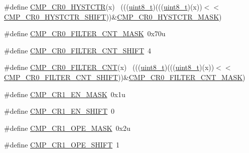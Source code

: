 \begin{DoxyCompactItemize}
\item 
\#define \hyperlink{group___c_m_p___register___masks_ga3ac2621a332671b38fa231e1fa14d26d}{C\+M\+P\+\_\+\+C\+R0\+\_\+\+H\+Y\+S\+T\+C\+TR}(x)                                          ~(((\hyperlink{_p_e___types_8h_aba7bc1797add20fe3efdf37ced1182c5}{uint8\+\_\+t})(((\hyperlink{_p_e___types_8h_aba7bc1797add20fe3efdf37ced1182c5}{uint8\+\_\+t})(x))$<$$<$\hyperlink{group___c_m_p___register___masks_ga12a965eae39b79d9e6066de9af418df3}{C\+M\+P\+\_\+\+C\+R0\+\_\+\+H\+Y\+S\+T\+C\+T\+R\+\_\+\+S\+H\+I\+FT}))\&\hyperlink{group___c_m_p___register___masks_ga9a81a95d8ceda15abb107f3c961e2f03}{C\+M\+P\+\_\+\+C\+R0\+\_\+\+H\+Y\+S\+T\+C\+T\+R\+\_\+\+M\+A\+SK})
\item 
\#define \hyperlink{group___c_m_p___register___masks_gab1e98c122818fe880217f72fab932ac2}{C\+M\+P\+\_\+\+C\+R0\+\_\+\+F\+I\+L\+T\+E\+R\+\_\+\+C\+N\+T\+\_\+\+M\+A\+SK}~0x70u
\item 
\#define \hyperlink{group___c_m_p___register___masks_ga07a4d57ab7d44b55b3d73f612aa7dd98}{C\+M\+P\+\_\+\+C\+R0\+\_\+\+F\+I\+L\+T\+E\+R\+\_\+\+C\+N\+T\+\_\+\+S\+H\+I\+FT}~4
\item 
\#define \hyperlink{group___c_m_p___register___masks_gad9cbe394311ddbb43945fcdade409c9e}{C\+M\+P\+\_\+\+C\+R0\+\_\+\+F\+I\+L\+T\+E\+R\+\_\+\+C\+NT}(x)                                    ~(((\hyperlink{_p_e___types_8h_aba7bc1797add20fe3efdf37ced1182c5}{uint8\+\_\+t})(((\hyperlink{_p_e___types_8h_aba7bc1797add20fe3efdf37ced1182c5}{uint8\+\_\+t})(x))$<$$<$\hyperlink{group___c_m_p___register___masks_ga07a4d57ab7d44b55b3d73f612aa7dd98}{C\+M\+P\+\_\+\+C\+R0\+\_\+\+F\+I\+L\+T\+E\+R\+\_\+\+C\+N\+T\+\_\+\+S\+H\+I\+FT}))\&\hyperlink{group___c_m_p___register___masks_gab1e98c122818fe880217f72fab932ac2}{C\+M\+P\+\_\+\+C\+R0\+\_\+\+F\+I\+L\+T\+E\+R\+\_\+\+C\+N\+T\+\_\+\+M\+A\+SK})
\item 
\#define \hyperlink{group___c_m_p___register___masks_ga2492ad39a9661a1217cc26f20bd31ef2}{C\+M\+P\+\_\+\+C\+R1\+\_\+\+E\+N\+\_\+\+M\+A\+SK}~0x1u
\item 
\#define \hyperlink{group___c_m_p___register___masks_gacaacf0894bdf41eb49de1ae81075fa2b}{C\+M\+P\+\_\+\+C\+R1\+\_\+\+E\+N\+\_\+\+S\+H\+I\+FT}~0
\item 
\#define \hyperlink{group___c_m_p___register___masks_gaaad42787753465406dd5006f228049dd}{C\+M\+P\+\_\+\+C\+R1\+\_\+\+O\+P\+E\+\_\+\+M\+A\+SK}~0x2u
\item 
\#define \hyperlink{group___c_m_p___register___masks_ga5c273c5f23e09e69a9589a285cbe2c24}{C\+M\+P\+\_\+\+C\+R1\+\_\+\+O\+P\+E\+\_\+\+S\+H\+I\+FT}~1

\end{DoxyCompactItemize}

